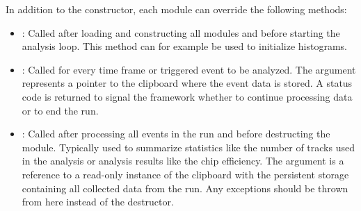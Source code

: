 In addition to the constructor, each module can override the following methods:
\begin{itemize}
\item {}: Called after loading and constructing all modules and before starting the analysis loop.
This method can for example be used to initialize histograms.
\item {}: Called for every time frame or triggered event to be analyzed. The argument represents a pointer to the clipboard where the event data is stored.
A status code is returned to signal the framework whether to continue processing data or to end the run.
\item {}: Called after processing all events in the run and before destructing the module.
Typically used to summarize statistics like the number of tracks used in the analysis or analysis results like the chip efficiency.
The argument is a reference to a read-only instance of the clipboard with the persistent storage containing all collected data from the run.
Any exceptions should be thrown from here instead of the destructor.
\end{itemize}
